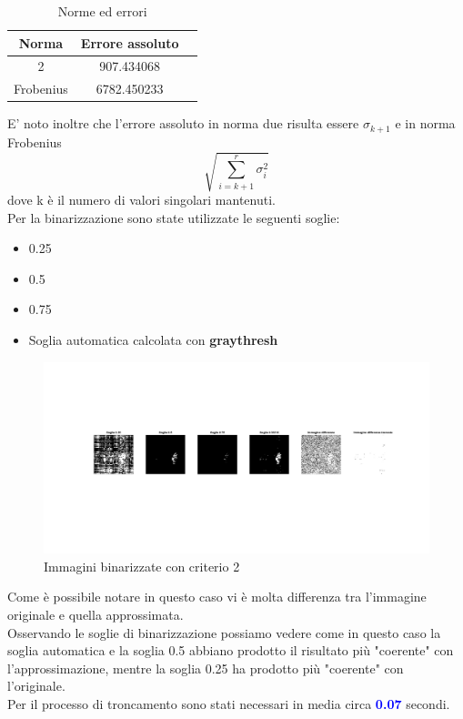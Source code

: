 \begin{table}[H]
    \centering
    \begin{tabular}{|c|c|c|}
        \hline
        \textbf{Norma} & \textbf{Errore assoluto} \\
        \hline
        2 &  907.434068 \\
        \hline
        Frobenius &6782.450233 \\
        \hline
    \end{tabular}
    \caption{Norme ed errori}
\end{table}

\noindent
E' noto inoltre che l'errore assoluto in norma due risulta essere $\sigma_{k+1}$ e in norma Frobenius 
\begin{equation}
    \sqrt{\sum_{i=k+1}^{r}\sigma_i^2}
\end{equation}
 dove k è il numero di valori singolari mantenuti.\\
Per la binarizzazione sono state utilizzate le seguenti soglie:
\begin{itemize}
    \item 0.25
    \item 0.5
    \item 0.75
    \item Soglia automatica calcolata con \textbf{graythresh}
\end{itemize}

\begin{figure}[H]
    \centering
     \includegraphics[width=\textwidth]{images/Criterio2.jpg}
    \caption{Immagini binarizzate con criterio 2}
\end{figure}

\noindent Come è possibile notare in questo caso vi è molta differenza tra l'immagine originale e quella approssimata.\\
Osservando le soglie di binarizzazione possiamo vedere come in questo caso la soglia automatica e la soglia 0.5 abbiano prodotto il risultato più "coerente" con l'approssimazione, mentre la soglia 0.25 ha prodotto più "coerente" con l'originale.\\

\noindent Per il processo di troncamento sono stati necessari in media circa \textcolor{blue}{\textbf{0.07}} secondi.\\



